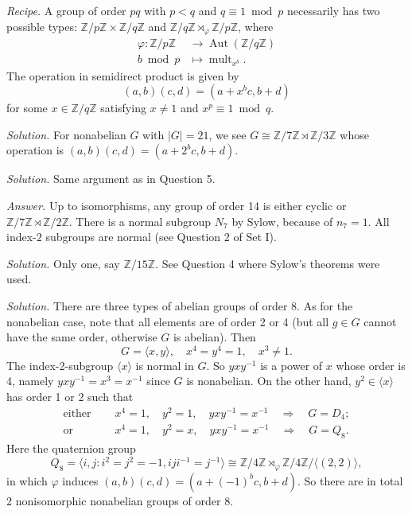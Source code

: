 \documentclass{mathproblems}
\newcommand\Z{\mathbb{Z}}
\begin{document}
\begin{questions}

{\color{violet}
\textit{Recipe.} A group of order $p q$ with $p<q$ and $q\equiv 1 \bmod p$ necessarily has two possible types: $\Z/p\Z \times \Z/q\Z$ and $\Z/q\Z\rtimes_{\varphi} \Z/p\Z$, where
$$
\begin{aligned}
\varphi: \Z/p\Z &\longrightarrow \operatorname{Aut}(\Z/q\Z)\\
b \bmod p & \longmapsto \operatorname{mult}_{x^b}.
\end{aligned}
$$
The operation in semidirect product is given by
$$
(a,b)(c,d)=(a+x^b c, b+d)
$$
for some $x\in \Z/q\Z$ satisfying $x\neq 1$ and $x^p\equiv 1\bmod q$.}

\textit{Solution.} 
For nonabelian $G$ with $|G|=21$, we see $G\cong\Z/7\Z\rtimes \Z/3\Z$ whose operation is $(a,b)(c,d)=(a+2^b c,b+d)$.


\textit{Solution.}
Same argument as in Question 5.


\textit{Answer.}
Up to isomorphisms, any group of order 14 is either cyclic or $\Z/7\Z\rtimes \Z/2\Z$. There is a normal subgroup $N_7$ by Sylow, because of $n_7=1$. All index-$2$ subgroups are normal (see Question 2 of Set I).


\textit{Solution.}
Only one, say $\Z/15\Z$. See Question 4 where Sylow's theorems were used.


\textit{Solution.}
There are three types of abelian groups of order 8. As for the nonabelian case, note that all elements are of order 2 or 4 (but all $g\in G$ cannot have the same order, otherwise $G$ is abelian). Then
$$
G=\langle x,y \rangle,\quad x^4=y^4=1, \quad x^3\neq 1.
$$
The index-2-subgroup $\langle x \rangle$ is normal in $G$. So $y x y^{-1}$ is a power of $x$ whose order is 4, namely $y x y^{-1}=x^3=x^{-1}$ since $G$ is nonabelian. On the other hand, $y^2\in \langle x\rangle$ has order 1 or 2 such that
$$
\begin{aligned}
\text{either }\quad & x^4=1,\quad y^2=1,\quad y x y^{-1}=x^{-1} \quad \Longrightarrow \quad G=D_4;\\
\text{or }\quad & x^4=1,\quad y^2=x,\quad y x y^{-1}=x^{-1} \quad \Longrightarrow \quad G=Q_8.
\end{aligned}
$$
Here the quaternion group
$$
Q_8=\langle i,j: i^2=j^2=-1, i j i^{-1}=j^{-1} \rangle \cong \Z/4\Z \rtimes_{\varphi} \Z/4\Z / \langle (2,2) \rangle,
$$
in which $\varphi$ induces $(a,b)(c,d)=(a+(-1)^b c,b+d)$. So there are in total 2 nonisomorphic nonabelian groups of order 8.


\end{questions}
\end{document}
